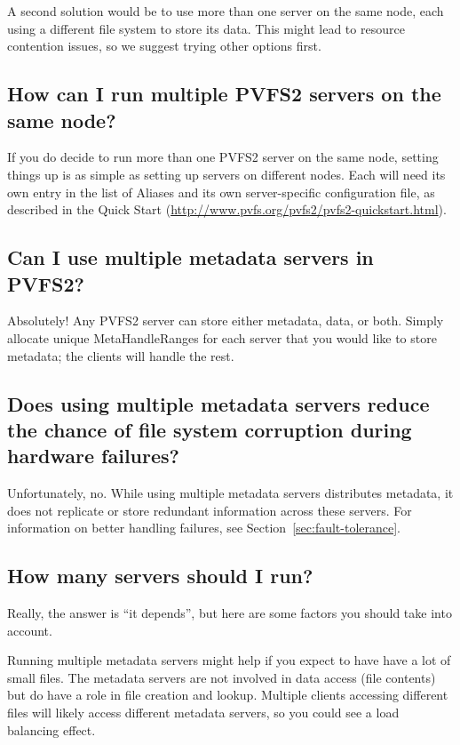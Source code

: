 \documentclass[11pt,letterpaper]{article}
\begin{document}
A second solution would be to use more than one server on the same node, each
using a different file system to store its data.  This might lead to resource
contention issues, so we suggest trying other options first.

\subsection{How can I run multiple PVFS2 servers on the same node?}

If you do decide to run more than one PVFS2 server on the same node,
setting things up is as simple as setting up servers on different
nodes.  Each will need its own entry in the list of Aliases and its
own server-specific configuration file, as described in the Quick Start
(\url{http://www.pvfs.org/pvfs2/pvfs2-quickstart.html}).

\subsection{Can I use multiple metadata servers in PVFS2?}

Absolutely!  Any PVFS2 server can store either metadata, data, or both.
Simply allocate unique MetaHandleRanges for each server that you would like to
store metadata; the clients will handle the rest.

\subsection{Does using multiple metadata servers reduce the chance of
            file system corruption during hardware failures?}

Unfortunately, no.  While using multiple metadata servers distributes
metadata, it does not replicate or store redundant information across
these servers.  For information on better handling failures, see
Section~\ref{sec:fault-tolerance}.

\subsection{How many servers should I run?}
\label{sec:howmany-servers}

Really, the answer is ``it depends'', but here are some factors you
should take into account.  

Running multiple metadata servers might help if you expect to have have
a lot of small files.  The metadata servers are not involved in data
access (file contents) but do have a role in file creation and lookup.
Multiple clients accessing different files will likely access different
metadata servers, so you could see a load balancing effect.
\end{document}
